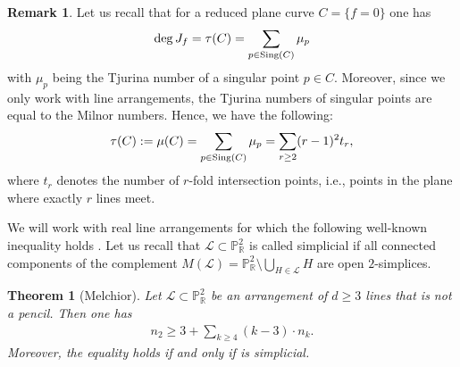 \documentclass[12pt]{article}
\theoremstyle{plain}
\newtheorem{theorem}[thm]{Theorem}
\theoremstyle{definition}
\newtheorem{remark}[thm]{Remark}
\begin{document}
\begin{remark}
Let us recall that for a reduced plane curve $C = \{f=0\}$ one has
$${\rm deg} \,J_{f} = \tau(C) = \sum_{p \in {\rm Sing}(C)} \mu_{p}$$
with $\mu_{p}$ being the Tjurina number of a singular point $p \in C$.
Moreover, since we only work with line arrangements, the Tjurina numbers of singular points are equal to the Milnor numbers. Hence, we have the following:
$$\tau(C) := \mu(C) = \sum_{p \in {\rm Sing}(C)} \mu_{p} = \sum_{r\geq 2}(r-1)^{2}t_{r},$$
where $t_{r}$ denotes the number of $r$-fold intersection points, i.e., points in the plane where exactly $r$ lines meet.
\end{remark}
We will work with real line arrangements for which the following well-known inequality holds \cite{Melchior}. Let us recall that $\mathcal{L}\subset \mathbb{P}^{2}_{\mathbb{R}}$ is called simplicial if all connected components of the complement $M(\mathcal{L}) = \mathbb{P}^{2}_{\mathbb{R}} \setminus \bigcup_{H \in \mathcal{L}}H$ are open $2$-simplices.
\begin{theorem}[Melchior]
Let $\mathcal{L} \subset \mathbb{P}^{2}_{\mathbb{R}}$ be an arrangement of $d\geq 3$ lines that is not a pencil. Then one has
\begin{align}\label{Melch}
n_2\geq 3+\sum_{k\geq 4} (k-3)\cdot n_k.
\end{align}
Moreover, the equality holds if and only if is simplicial.
\end{theorem}
\end{document}
